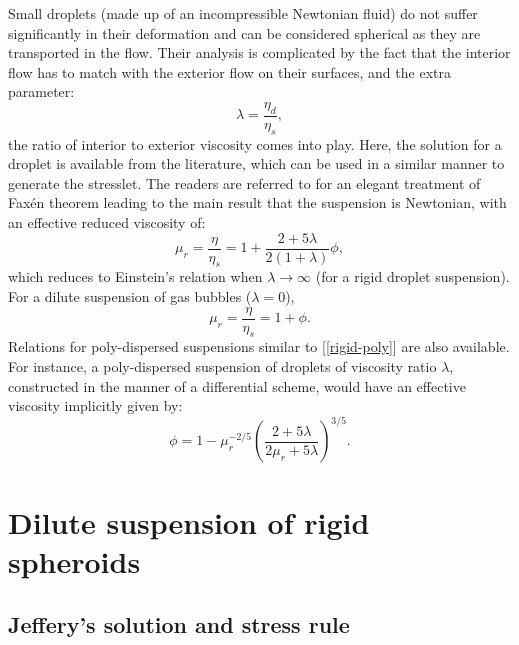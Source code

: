 \documentclass[english,fleqn,allpages]{ISTE_science}[2018/07/30]
\begin{document}
Small droplets (made up of an incompressible Newtonian fluid) do not
suffer significantly in their deformation and can be considered spherical
as they are transported in the flow. Their analysis is complicated
by the fact that the interior flow has to match with the exterior
flow on their surfaces, and the extra parameter:
\begin{equation}
\lambda=\frac{\eta_{d}}{\eta_{s}},
\end{equation}
the ratio of interior to exterior viscosity comes into play. Here,
the solution for a droplet is available from the literature, which
can be used in a similar manner to generate the stresslet. The readers
are referred to \cite{kim91} for an elegant treatment of Faxén theorem
leading to the main result that the suspension is Newtonian, with
an effective reduced viscosity of:
\begin{equation}
\mu_{r}=\frac{\eta}{\eta_{s}}=1+\frac{2+5\lambda}{2\left(1+\lambda\right)}\phi,
\end{equation}
which reduces to Einstein's relation when $\lambda\rightarrow\infty$
(for a rigid droplet suspension). For a dilute suspension of gas bubbles
($\lambda=0$),
\begin{equation}
\mu_{r}=\frac{\eta}{\eta_{s}}=1+\phi.
\end{equation}
\indent
Relations for poly-dispersed suspensions similar to [\ref{rigid-poly}]
are also available. For instance, a poly-dispersed suspension of droplets
of viscosity ratio $\lambda$, constructed in the manner of a differential
scheme, would have an effective viscosity implicitly given by:\vspace*{-3pt}
\begin{equation}
\phi=1-\mu_{r}^{-2/5}\left(\frac{2+5\lambda}{2\mu_{r}+5\lambda}\right)^{3/5}.
\end{equation}\vspace*{3pt}



\section{Dilute suspension of rigid spheroids}


\subsection{Jeffery's solution and stress rule}
\end{document}

